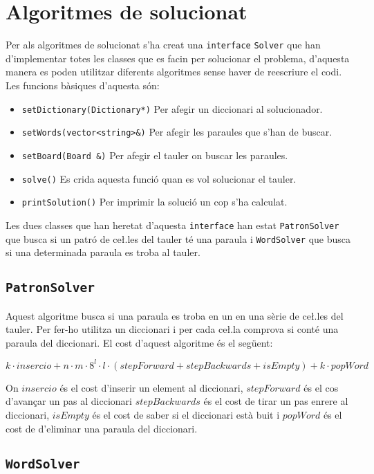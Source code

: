\documentclass{article}
\begin{document}
\section{Algoritmes de solucionat}

Per als algoritmes de solucionat s'ha creat una \verb|interface| \verb|Solver| que han d'implementar totes les classes que es facin per solucionar el problema, d'aquesta manera es poden utilitzar diferents algoritmes sense haver de reescriure el codi. Les funcions bàsiques d'aquesta són:

\begin{itemize}
	\item \verb|setDictionary(Dictionary*)| Per afegir un diccionari al solucionador.
	\item \verb|setWords(vector<string>&)| Per afegir les paraules que s'han de buscar.
	\item \verb|setBoard(Board &)| Per afegir el tauler on buscar les paraules.
	\item \verb|solve()| Es crida aquesta funció quan es vol solucionar el tauler.
	\item \verb|printSolution()| Per imprimir la solució un cop s'ha calculat.
\end{itemize}

Les dues classes que han heretat d'aquesta \verb|interface| han estat \verb|PatronSolver| que busca si un patró de ce\l.les del tauler té una paraula i \verb|WordSolver| que busca si una determinada paraula es troba al tauler.

\subsection{\texttt{PatronSolver}}
Aquest algoritme busca si una paraula es troba en un en una sèrie de ce\l.les del tauler. Per fer-ho utilitza un diccionari i per cada ce\l.la comprova si conté una paraula del diccionari. El cost d'aquest algoritme és el següent:

\[ k·insercio + n·m·8^l·l·(stepForward + stepBackwards + isEmpty) + k·popWord \]

On $insercio$ és el cost d'inserir un element al diccionari, $stepForward$ és el cos d'avançar un pas al diccionari $stepBackwards$ és el cost de tirar un pas enrere al diccionari, $isEmpty$ és el cost de saber si el diccionari està buit i $popWord$ és el
cost de d'eliminar una paraula del diccionari.

\subsection{\texttt{WordSolver}}
\end{document}
